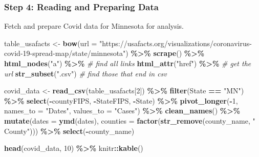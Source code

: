 \documentclass[
]{book}
\newenvironment{Shaded}{\begin{snugshade}}{\end{snugshade}}
\newcommand{\AttributeTok}[1]{\textcolor[rgb]{0.13,0.29,0.53}{#1}}
\newcommand{\CommentTok}[1]{\textcolor[rgb]{0.56,0.35,0.01}{\textit{#1}}}
\newcommand{\DecValTok}[1]{\textcolor[rgb]{0.00,0.00,0.81}{#1}}
\newcommand{\FunctionTok}[1]{\textcolor[rgb]{0.13,0.29,0.53}{\textbf{#1}}}
\newcommand{\NormalTok}[1]{#1}
\newcommand{\OtherTok}[1]{\textcolor[rgb]{0.56,0.35,0.01}{#1}}
\newcommand{\SpecialCharTok}[1]{\textcolor[rgb]{0.81,0.36,0.00}{\textbf{#1}}}
\newcommand{\StringTok}[1]{\textcolor[rgb]{0.31,0.60,0.02}{#1}}
\begin{document}
\hypertarget{step-4-reading-and-preparing-data}{%
\subsubsection{Step 4: Reading and Preparing Data}\label{step-4-reading-and-preparing-data}}

Fetch and prepare Covid data for Minnesota for analysis.

\begin{Shaded}
\begin{Highlighting}[]
\NormalTok{table\_usafacts }\OtherTok{\textless{}{-}} \FunctionTok{bow}\NormalTok{(}\AttributeTok{url =} \StringTok{"https://usafacts.org/visualizations/coronavirus{-}covid{-}19{-}spread{-}map/state/minnesota"}\NormalTok{) }\SpecialCharTok{\%\textgreater{}\%}
  \FunctionTok{scrape}\NormalTok{() }\SpecialCharTok{\%\textgreater{}\%}  \FunctionTok{html\_nodes}\NormalTok{(}\StringTok{"a"}\NormalTok{) }\SpecialCharTok{\%\textgreater{}\%}       \CommentTok{\# find all links}
  \FunctionTok{html\_attr}\NormalTok{(}\StringTok{"href"}\NormalTok{) }\SpecialCharTok{\%\textgreater{}\%}     \CommentTok{\# get the url}
  \FunctionTok{str\_subset}\NormalTok{(}\StringTok{".csv"}\NormalTok{)        }\CommentTok{\# find those that end in csv}

\NormalTok{covid\_data }\OtherTok{\textless{}{-}} \FunctionTok{read\_csv}\NormalTok{(table\_usafacts[}\DecValTok{2}\NormalTok{]) }\SpecialCharTok{\%\textgreater{}\%}
  \FunctionTok{filter}\NormalTok{(State }\SpecialCharTok{==} \StringTok{"MN"}\NormalTok{) }\SpecialCharTok{\%\textgreater{}\%}
  \FunctionTok{select}\NormalTok{(}\SpecialCharTok{{-}}\NormalTok{countyFIPS, }\SpecialCharTok{{-}}\NormalTok{StateFIPS, }\SpecialCharTok{{-}}\NormalTok{State) }\SpecialCharTok{\%\textgreater{}\%}
  \FunctionTok{pivot\_longer}\NormalTok{(}\SpecialCharTok{{-}}\DecValTok{1}\NormalTok{, }\AttributeTok{names\_to =} \StringTok{"Dates"}\NormalTok{, }\AttributeTok{values\_to =} \StringTok{"Cases"}\NormalTok{) }\SpecialCharTok{\%\textgreater{}\%}
  \FunctionTok{clean\_names}\NormalTok{() }\SpecialCharTok{\%\textgreater{}\%}
  \FunctionTok{mutate}\NormalTok{(}\AttributeTok{dates =} \FunctionTok{ymd}\NormalTok{(dates),}
         \AttributeTok{counties =} \FunctionTok{factor}\NormalTok{(}\FunctionTok{str\_remove}\NormalTok{(county\_name, }\StringTok{" County"}\NormalTok{))) }\SpecialCharTok{\%\textgreater{}\%}
  \FunctionTok{select}\NormalTok{(}\SpecialCharTok{{-}}\NormalTok{county\_name)}

\FunctionTok{head}\NormalTok{(covid\_data, }\DecValTok{10}\NormalTok{) }\SpecialCharTok{\%\textgreater{}\%}\NormalTok{ knitr}\SpecialCharTok{::}\FunctionTok{kable}\NormalTok{()}
\end{Highlighting}
\end{Shaded}
\end{document}
